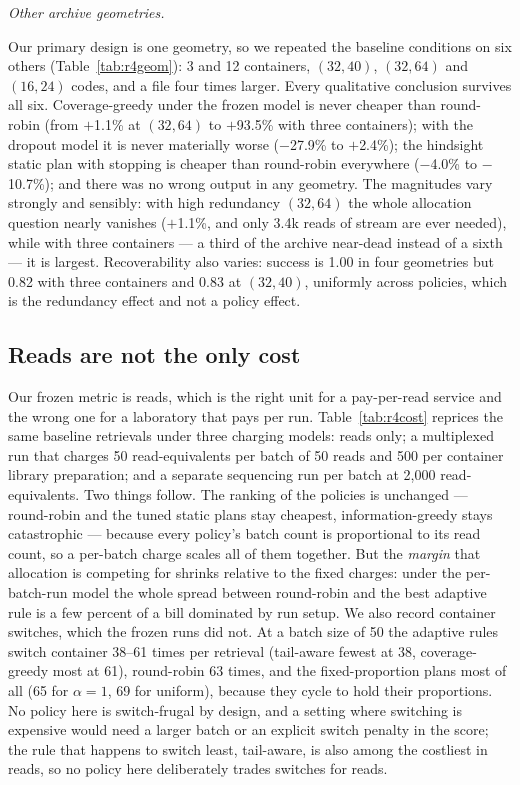 \documentclass[conference,onecolumn,11pt]{IEEEtran}
\begin{document}
\emph{Other archive geometries.}

Our primary design is one geometry, so we repeated the baseline conditions on six others
(Table~\ref{tab:r4geom}): 3 and 12 containers, $(32,40)$, $(32,64)$ and $(16,24)$ codes, and a file four
times larger.  Every qualitative conclusion survives all six.  Coverage-greedy under the frozen model is
never cheaper than round-robin (from $+$1.1\% at $(32,64)$ to $+$93.5\% with three containers); with the
dropout model it is never materially worse ($-$27.9\% to $+$2.4\%); the hindsight static plan with
stopping is cheaper than round-robin everywhere ($-$4.0\% to $-$10.7\%); and there was no wrong output in
any geometry.  The magnitudes vary strongly and sensibly: with high redundancy $(32,64)$ the whole
allocation question nearly vanishes ($+$1.1\%, and only 3.4k reads of stream are ever needed), while with
three containers --- a third of the archive near-dead instead of a sixth --- it is largest.  Recoverability
also varies: success is 1.00 in four geometries but 0.82 with three containers and 0.83 at $(32,40)$,
uniformly across policies, which is the redundancy effect and not a policy effect.

\subsection{Reads are not the only cost}\label{sec:res-cost}

Our frozen metric is reads, which is the right unit for a pay-per-read service and the wrong one for a
laboratory that pays per run.  Table~\ref{tab:r4cost} reprices the same baseline retrievals under three
charging models: reads only; a multiplexed run that charges 50 read-equivalents per batch of 50 reads
and 500 per container library preparation; and a separate sequencing run per batch at 2{,}000
read-equivalents.  Two things follow.  The ranking of the policies is unchanged --- round-robin and the
tuned static plans stay cheapest, information-greedy stays catastrophic --- because every policy's batch
count is proportional to its read count, so a per-batch charge scales all of them together.  But the
\emph{margin} that allocation is competing for shrinks relative to the fixed charges: under the
per-batch-run model the whole spread between round-robin and the best adaptive rule is a few percent of
a bill dominated by run setup.  We also record container switches, which the frozen runs did
not.  At a batch size of 50 the adaptive rules switch container 38--61 times per retrieval (tail-aware
fewest at 38, coverage-greedy most at 61), round-robin 63 times, and the fixed-proportion plans most of
all (65 for $\alpha{=}1$, 69 for uniform), because they cycle to hold their proportions.  No policy
here is switch-frugal by design, and a setting where switching is expensive would need a larger batch
or an explicit switch penalty in the score; the rule that happens to switch least, tail-aware, is also
among the costliest in reads, so no policy here deliberately trades switches for reads.
\end{document}
